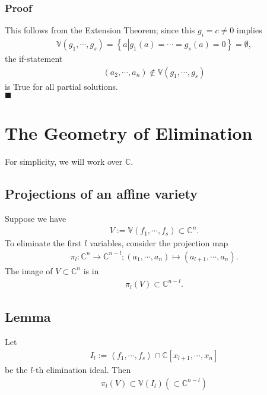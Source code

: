 \documentclass[11pt]{book}
\begin{document}
\subsubsection{Proof}
This follows from the Extension Theorem; since this $g_i = c \neq 0$ implies
\begin{eqnarray}
\mathbb{V}(g_1, \cdots, g_s) = \left\{a \left| g_1(a) = \cdots = g_s(a) = 0\right. \right\}= \emptyset,
\end{eqnarray}
the if-statement
\begin{eqnarray}
(a_2, \cdots, a_n) \notin \mathbb{V}(g_1, \cdots, g_s)
\end{eqnarray}
is True for all partial solutions.\\
$\blacksquare$

\section{The Geometry of Elimination}
For simplicity, we will work over $\mathbb{C}$.

\subsection{Projections of an affine variety}
Suppose we have
\begin{eqnarray}
V := \mathbb{V}(f_1, \cdots, f_s) \subset \mathbb{C}^n.
\end{eqnarray}
To eliminate the first $l$ variables, consider the projection map
\begin{eqnarray}
\pi_l : \mathbb{C}^n \to \mathbb{C}^{n-l}; (a_1, \cdots, a_n) \mapsto (a_{l+1}, \cdots, a_n).
\end{eqnarray}
The image of $V \subset \mathbb{C}^n$ is in
\begin{eqnarray}
\pi_l(V) \subset \mathbb{C}^{n-l}.
\end{eqnarray}

\subsection{Lemma}
\label{pi_lVIsInVI_l}
Let
\begin{eqnarray}
I_l := \left< f_1, \cdots, f_s\right> \cap \mathbb{C}[x_{l+1}, \cdots, x_n]
\end{eqnarray}
be the $l$-th elimination ideal.
Then
\begin{eqnarray}
\pi_l(V) \subset \mathbb{V}(I_l) (\subset \mathbb{C}^{n-l})
\end{eqnarray}
\end{document}
